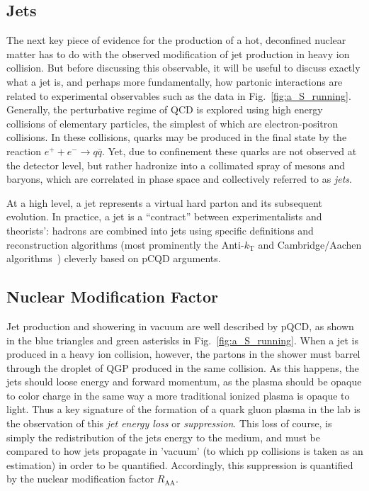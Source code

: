 \subsection{Jets}
The next key piece of evidence for the production of a hot, deconfined nuclear matter has to do with the observed modification of jet production in heavy ion collision. But before discussing this observable, it will be useful to discuss exactly what a jet is, and perhaps more fundamentally, how partonic interactions are related to experimental observables such as the data in Fig.~\ref{fig:a_S_running}. Generally, the perturbative regime of QCD is explored using high energy collisions of elementary particles, the simplest of which are electron-positron collisions. In these collisions, quarks may be produced in the final state by the reaction $e^++e^- \rightarrow q\bar{q}$. Yet, due to confinement these quarks are not observed at the detector level, but rather hadronize into a collimated spray of mesons and baryons, which are correlated in phase space and collectively referred to as \textit{jets}. 

At a high level, a jet represents a virtual hard parton and its subsequent evolution. In practice, a jet is a ``contract'' between experimentalists and theorists': hadrons are combined into jets using specific definitions and reconstruction algorithms (most prominently the Anti-$k_\mathrm{T}$ and Cambridge/Aachen algorithms~\cite{Atkin2015}) cleverly based on pCQD arguments. 

\subsection{Nuclear Modification Factor}
\label{sec:raa}
Jet production and showering in vacuum are well described by pQCD, as shown in the blue triangles and green asterisks in Fig.~\ref{fig:a_S_running}. When a jet is produced in a heavy ion collision, however, the partons in the shower must barrel through the droplet of QGP produced in the same collision. As this happens, the jets should loose energy and forward momentum, as the plasma should be opaque to color charge in the same way a more traditional ionized plasma is opaque to light.  Thus a key signature of the formation of a quark gluon plasma in the lab is the observation of this \textit{jet energy loss} or \textit{suppression}. This loss of course, is simply the redistribution of the jets energy to the medium, and must be compared to how jets propagate in 'vacuum' (to which pp collisions is taken as an estimation) in order to be quantified. Accordingly, this suppression is quantified by the nuclear modification factor $R_\mathrm{AA}$. 

